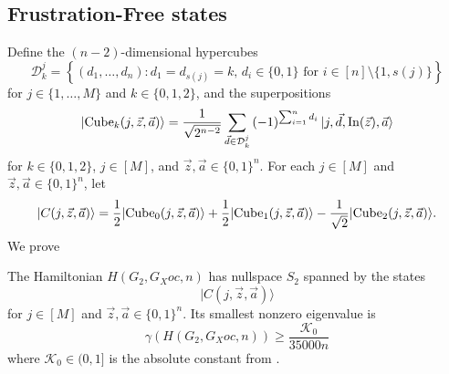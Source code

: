 \documentclass[../thesis-main/thesis-main]{subfiles}
\begin{document}
\subsection{Frustration-Free states}

Define the $(n-2)$-dimensional hypercubes
\[
\mathcal{D}_{k}^{j}=\left\{ (d_{1},\ldots,d_{n})\colon d_{1}=d_{s(j)}=k,\, d_{i}\in\{0,1\}\text{ for }i\in[n]\setminus\{1,s(j)\}\right\} 
\]
for $j\in\{1,\ldots,M\}$ and $k\in\{0,1,2\}$, and the superpositions
\[
|{\operatorname{Cube}_{k}(j,\vec{z},\vec{a})}\rangle=\frac{1}{\sqrt{2^{n-2}}}\sum_{\vec{d}\in\mathcal{D}_{k}^{j}}\left(-1\right)^{\sum_{i=1}^{n}d_{i}}|j,\vec{d},\operatorname{In}(\vec{z}),\vec{a}\rangle
\]
for $k\in\{0,1,2\}$, $j\in[M]$, and $\vec{z},\vec{a}\in\{0,1\}^{n}.$
For each $j\in[M]$ and $\vec{z},\vec{a}\in\{0,1\}^{n}$, let
\begin{equation}
|C(j,\vec{z},\vec{a})\rangle=\frac{1}{2}|{\operatorname{Cube}_{0}(j,\vec{z},\vec{a})}\rangle+\frac{1}{2}|{\operatorname{Cube}_{1}(j,\vec{z},\vec{a})}\rangle-\frac{1}{\sqrt{2}}|{\operatorname{Cube}_{2}(j,\vec{z},\vec{a})}\rangle.\label{eq:cubestates-1}
\end{equation}
We prove

\begin{lemma}
\label{lem:beta_bound}The Hamiltonian $H(G_{2},G_Xoc,n)$ has nullspace $S_2$ spanned by the states
\[
|C(j,\vec{z},\vec{a})\rangle
\]
for $j\in[M]$ and $\vec{z},\vec{a}\in\{0,1\}^{n}$. Its smallest nonzero eigenvalue is 
\[
  \gamma(H(G_{2},G_Xoc,n)) \geq \frac{\mathcal{K}_0}{35000n}
\]
where $\mathcal{K}_0\in (0,1]$ is the absolute constant from .
\end{lemma}
\end{document}
